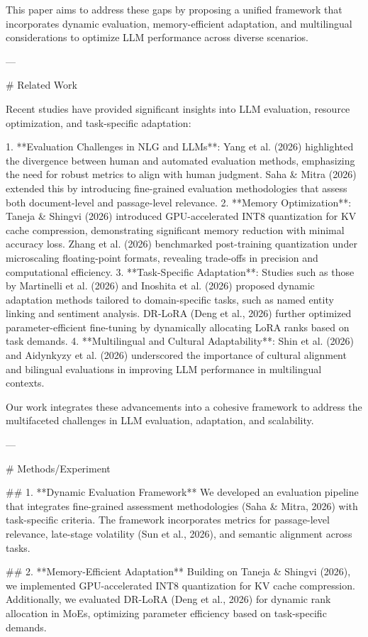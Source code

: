 This paper aims to address these gaps by proposing a unified framework that incorporates dynamic evaluation, memory-efficient adaptation, and multilingual considerations to optimize LLM performance across diverse scenarios.  

---

# Related Work  

Recent studies have provided significant insights into LLM evaluation, resource optimization, and task-specific adaptation:  

1. **Evaluation Challenges in NLG and LLMs**: Yang et al. (2026) highlighted the divergence between human and automated evaluation methods, emphasizing the need for robust metrics to align with human judgment. Saha & Mitra (2026) extended this by introducing fine-grained evaluation methodologies that assess both document-level and passage-level relevance.  
2. **Memory Optimization**: Taneja & Shingvi (2026) introduced GPU-accelerated INT8 quantization for KV cache compression, demonstrating significant memory reduction with minimal accuracy loss. Zhang et al. (2026) benchmarked post-training quantization under microscaling floating-point formats, revealing trade-offs in precision and computational efficiency.  
3. **Task-Specific Adaptation**: Studies such as those by Martinelli et al. (2026) and Inoshita et al. (2026) proposed dynamic adaptation methods tailored to domain-specific tasks, such as named entity linking and sentiment analysis. DR-LoRA (Deng et al., 2026) further optimized parameter-efficient fine-tuning by dynamically allocating LoRA ranks based on task demands.  
4. **Multilingual and Cultural Adaptability**: Shin et al. (2026) and Aidynkyzy et al. (2026) underscored the importance of cultural alignment and bilingual evaluations in improving LLM performance in multilingual contexts.  

Our work integrates these advancements into a cohesive framework to address the multifaceted challenges in LLM evaluation, adaptation, and scalability.  

---

# Methods/Experiment  

## 1. **Dynamic Evaluation Framework**  
We developed an evaluation pipeline that integrates fine-grained assessment methodologies (Saha & Mitra, 2026) with task-specific criteria. The framework incorporates metrics for passage-level relevance, late-stage volatility (Sun et al., 2026), and semantic alignment across tasks.  

## 2. **Memory-Efficient Adaptation**  
Building on Taneja & Shingvi (2026), we implemented GPU-accelerated INT8 quantization for KV cache compression. Additionally, we evaluated DR-LoRA (Deng et al., 2026) for dynamic rank allocation in MoEs, optimizing parameter efficiency based on task-specific demands.  

